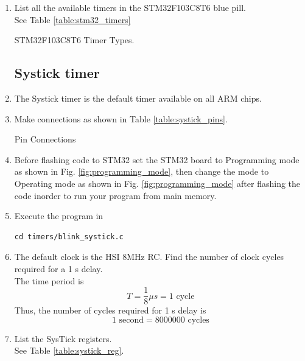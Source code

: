 \documentclass[journal,12pt,twocolumn]{IEEEtran}
\renewcommand\thesection{\arabic{section}}
\renewcommand\thesubsection{\thesection.\arabic{subsection}}
\begin{document}
\begin{enumerate}[label=\thesubsection.\arabic*.,ref=\thesubsection.\theenumi]
\item List all the available timers in the STM32F103C8T6 blue pill.
\\
\solution  See Table \ref{table:stm32_timers}
\begin{table}[!ht]
\centering
\footnotesize

\caption{STM32F103C8T6 Timer Types.}
\label{table:stm32_timers}
\end{table}

\subsection{Systick timer}
\item The Systick timer is the default timer available on all ARM chips. 
\item Make connections as shown in Table \ref{table:systick_pins}.
\begin{table}[!ht]
\centering
\footnotesize

\caption{Pin Connections}
\label{table:systick_pins}
\end{table}
\item Before flashing code to STM32 set the STM32 board to Programming mode as shown in Fig. \ref{fig:programming_mode}, then change the mode to Operating mode as shown in Fig. \ref{fig:programming_mode} after flashing the code inorder to run your program from main memory.
\item Execute the program in 
\begin{lstlisting}
cd timers/blink_systick.c
\end{lstlisting}
\item The default clock is the HSI 8MHz RC.  Find the number of clock cycles required for a 1 s delay.
\\
\solution The time period is
\begin{equation}
T = \frac{1}{8}\mu s = 1 \text{ cycle}
\end{equation}
Thus, the number of cycles required for 1 s delay is
\begin{equation}
1 \text{ second} = 8000000 \text{ cycles}
\end{equation}
\item List the SysTick registers.
\\
\solution See Table \ref{table:systick_reg}.
\begin{table}[!ht]

\end{table}
\end{enumerate}
\end{document}
